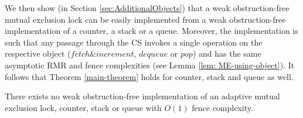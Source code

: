 We then show (in Section \ref{sec:AdditionalObjects}) that a weak obstruction-free mutual exclusion lock can be easily implemented from a weak obstruction-free implementation of a counter, a stack or a queue. Moreover, the implementation is such that any passage through the CS invokes a single operation on the respective object ($fetch \& increment$, $dequeue$ or $pop$) and has the same asymptotic RMR and fence complexities (see Lemma \ref{lem: ME-using-object}). It follows that Theorem \ref{main-theorem} holds for counter, stack and queue as well.

\begin{corollary}
	There exists no weak obstruction-free implementation of an adaptive mutual exclusion lock, counter, stack or queue with $O(1)$ fence complexity.
\end{corollary}

